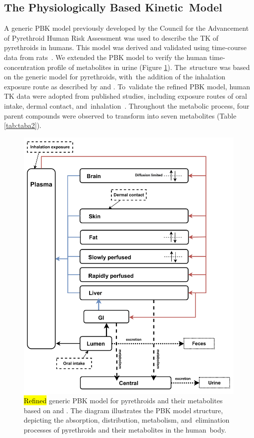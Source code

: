 \documentclass[toxics,article,accept,pdftex,moreauthors]{Definitions/mdpi}
\begin{document}
\subsection{The Physiologically Based Kinetic~Model}\label{the-physiologically-based-kinetic-model}

A generic PBK model previously developed by the Council for the
Advancement of Pyrethroid Human Risk Assessment
\citep{song2019evaluation, mallick2020development, mallick_physiologically_2020}
was used to describe the TK of pyrethroids in humans. This model was
derived and validated using time-course data from rats~\citep{mirfazaelian_development_2006, tornero2010evaluation}. We
extended the PBK model to verify the human time-concentration profile of
metabolites in urine (Figure \ref{fig:fig2}). The~structure was based on
the generic model for pyrethroids, with~the addition of the inhalation
exposure route as described by \citet{beaudouin2010stochastic} and
\citet{quindroit2019estimating}. To~validate the refined PBK model,
human TK data were adopted from published studies, including exposure
routes of oral intake, dermal contact, and~inhalation~\citep{leng1997human, leng1997biological, ratelle2015toxicokinetics, ratelle2015time}.
Throughout the metabolic process, four parent compounds were observed to
transform into seven metabolites (Table \ref{tab:taba2}).

\vspace{-8pt}\begin{figure}[H]
\includegraphics[width=0.8\linewidth,]{figures/fig2_pbk} \caption{\hl{Refined} %
generic PBK model for pyrethroids and their metabolites based on \citet{mallick2020development} and \citet{quindroit2019estimating}. 
The diagram illustrates the PBK model structure, depicting the absorption, 
distribution, metabolism, and~elimination processes of pyrethroids and their metabolites in the human~body.}\label{fig:fig2}
\end{figure}
\end{document}
